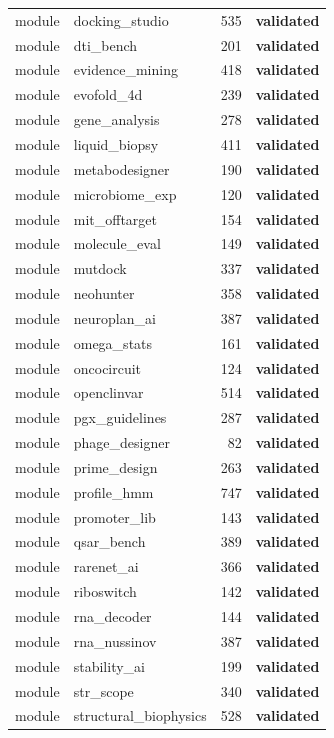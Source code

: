 \begin{center}
\begin{longtable}{llrl}
module & docking\_studio & 535 & \textbf{validated}\\
module & dti\_bench & 201 & \textbf{validated}\\
module & evidence\_mining & 418 & \textbf{validated}\\
module & evofold\_4d & 239 & \textbf{validated}\\
module & gene\_analysis & 278 & \textbf{validated}\\
module & liquid\_biopsy & 411 & \textbf{validated}\\
module & metabodesigner & 190 & \textbf{validated}\\
module & microbiome\_exp & 120 & \textbf{validated}\\
module & mit\_offtarget & 154 & \textbf{validated}\\
module & molecule\_eval & 149 & \textbf{validated}\\
module & mutdock & 337 & \textbf{validated}\\
module & neohunter & 358 & \textbf{validated}\\
module & neuroplan\_ai & 387 & \textbf{validated}\\
module & omega\_stats & 161 & \textbf{validated}\\
module & oncocircuit & 124 & \textbf{validated}\\
module & openclinvar & 514 & \textbf{validated}\\
module & pgx\_guidelines & 287 & \textbf{validated}\\
module & phage\_designer & 82 & \textbf{validated}\\
module & prime\_design & 263 & \textbf{validated}\\
module & profile\_hmm & 747 & \textbf{validated}\\
module & promoter\_lib & 143 & \textbf{validated}\\
module & qsar\_bench & 389 & \textbf{validated}\\
module & rarenet\_ai & 366 & \textbf{validated}\\
module & riboswitch & 142 & \textbf{validated}\\
module & rna\_decoder & 144 & \textbf{validated}\\
module & rna\_nussinov & 387 & \textbf{validated}\\
module & stability\_ai & 199 & \textbf{validated}\\
module & str\_scope & 340 & \textbf{validated}\\
module & structural\_biophysics & 528 & \textbf{validated}\\

\end{longtable}
\end{center}
